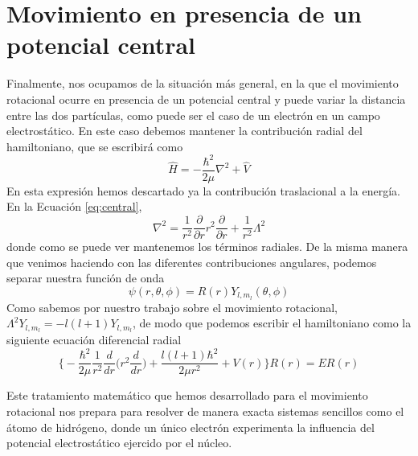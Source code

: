 \section{Movimiento en presencia de un potencial central}
Finalmente, nos ocupamos de la situación más general,
en la que el movimiento rotacional ocurre en presencia
de un potencial central y puede variar la distancia 
entre las dos partículas, como puede ser el caso de un
electrón en un campo electrostático. En este caso debemos
mantener la contribución radial del hamiltoniano, que
se escribirá como
\begin{equation}
    \hat{H} = -\frac{\hbar^2}{2\mu}\nabla^2 + \hat{V}
    \label{eq:central}
\end{equation}
En esta expresión hemos descartado ya la contribución
traslacional a la energía. En la Ecuación \ref{eq:central},
\begin{equation}
        \nabla^2=\frac{1}{r^2}\frac{\partial}{\partial r}r^2\frac{\partial}{\partial r} + \frac{1}{r^2}\Lambda^2
\end{equation}
donde como se puede ver mantenemos los términos radiales.
De la misma manera que venimos haciendo con las diferentes
contribuciones angulares, podemos separar nuestra función
de onda
\begin{equation}
    \psi(r,\theta, \phi)=R(r)Y_{l,m_l}(\theta, \phi)
\end{equation}
Como sabemos por nuestro trabajo sobre el movimiento 
rotacional, $\Lambda^2Y_{l,m_l}=-l(l+1)Y_{l,m_l}$, de modo 
que podemos escribir el hamiltoniano como la siguiente
ecuación diferencial radial
\begin{equation}
    \bigg\{-\frac{\hbar^2}{2\mu}\frac{1}{r^2}\frac{d}{dr}\bigg(r^2\frac{d}{dr}\bigg) + \frac{l(l+1)\hbar^2}{2\mu r^2} + V(r)\bigg\}R(r)=ER(r)
\end{equation}

Este tratamiento matemático que hemos desarrollado
para el movimiento rotacional nos prepara para resolver
de manera exacta sistemas sencillos como el átomo de 
hidrógeno, donde un único electrón experimenta la
influencia del potencial electrostático ejercido por 
el núcleo.